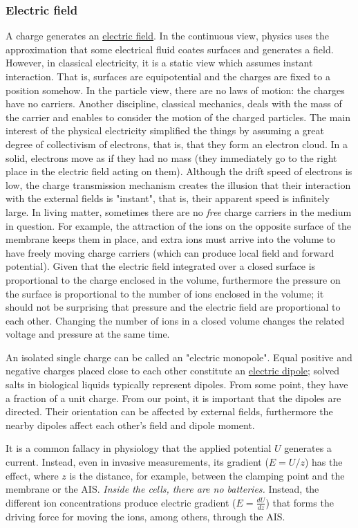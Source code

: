 \subsubsection{Electric field\label{sec:Physics-Gradient}}
A charge generates an \href{http://hyperphysics.phy-astr.gsu.edu/hbase/hframe.html}{electric field}. 
In the continuous view,
physics uses the approximation that some electrical fluid coates surfaces and generates a field.
However, in classical electricity, it is a static view which assumes instant interaction.
That is,  surfaces are equipotential and the charges are fixed to a position somehow. In the particle view, there are no laws of motion: the charges have no carriers.
Another discipline, classical mechanics, deals with the mass of the carrier and enables to consider the motion  of the charged particles.
The main interest of the physical electricity simplified the things by assuming a great degree of
collectivism of electrons, that is, that they form an electron cloud.
In a solid, electrons move as if they had no mass (they immediately go to the right place in the electric field acting on them).
Although the drift speed of electrons is low, the charge transmission mechanism creates the illusion that their interaction with the
external fields is "instant", that is, their apparent speed 
is infinitely large. In living matter, sometimes there are no
\textit{free} charge carriers in the medium in question. For example,
the attraction of the ions on the opposite surface of the membrane
keeps them in place, and extra ions must arrive into the volume
to have freely moving charge carriers (which can produce local field and forward potential).  
Given that the electric field integrated over a closed surface is proportional to the charge enclosed in the volume, furthermore the pressure on the surface is proportional to the
number of ions enclosed in the volume; it should not be 
surprising that pressure and the electric field are proportional to each other. Changing the number of ions
in a closed volume changes the related voltage and
pressure at the same time.

{
An isolated single charge can be called an "electric monopole". Equal positive and negative charges placed close to each other constitute an \href{http://hyperphysics.phy-astr.gsu.edu/hbase/hframe.html}{electric dipole}; solved salts in biological liquids typically represent dipoles.
From some point, they have a fraction of a unit charge. From our point, it is important that the dipoles are directed. 
Their orientation can be affected by external fields, furthermore the nearby dipoles affect each other's field and dipole moment.


It is a common fallacy in physiology that the applied potential $U$ generates
a current. Instead, even in invasive measurements, its gradient ($E=U/z$) has the effect, where $z$ is the distance, for example, between the clamping point and the membrane or the \gls{AIS}.
\textit{Inside the cells, there are no batteries.}
Instead, the different ion concentrations produce electric gradient ($E=\frac{dU}{dz}$) that forms the driving force for moving the ions, among others, through the \gls{AIS}.
}


